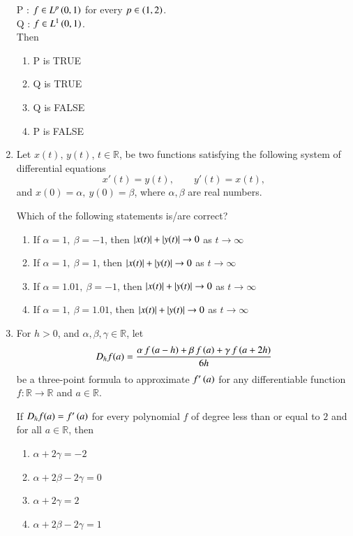 \documentclass[journal,12pt,onecolumn]{IEEEtran}
\theoremstyle{remark}
\begin{document}
\begin{enumerate}[start=1, label=Q.\arabic*]
P : $f\in L^{p}\left(0,1\right)$ for every $p\in \left(1,2\right)$.\\
Q : $f\in L^{1}\left(0,1\right)$.\\

Then
\begin{enumerate}
\item P is TRUE
\item Q is TRUE
\item Q is FALSE
\item P is FALSE
\end{enumerate}

\hfill{}


\item Let $x(t),\,y(t)$, $t\in \mathbb{R}$, be two functions satisfying the following system of differential equations\brak{:}
\[
x'(t)=y(t),\qquad y'(t)=x(t),
\]
and $x(0)=\alpha,\ y(0)=\beta$, where $\alpha,\beta$ are real numbers.  

Which of the following statements is/are correct?
\begin{enumerate}
\item If $\alpha=1,\ \beta=-1$, then $\left\vert x(t)\right\vert+\left\vert y(t)\right\vert\to 0$ as $t\to \infty$
\item If $\alpha=1,\ \beta=1$, then $\left\vert x(t)\right\vert+\left\vert y(t)\right\vert\to 0$ as $t\to \infty$
\item If $\alpha=1.01,\ \beta=-1$, then $\left\vert x(t)\right\vert+\left\vert y(t)\right\vert\to 0$ as $t\to \infty$
\item If $\alpha=1,\ \beta=1.01$, then $\left\vert x(t)\right\vert+\left\vert y(t)\right\vert\to 0$ as $t\to \infty$
\end{enumerate}

\hfill{}
\item For $h>0$, and $\alpha,\beta,\gamma\in \mathbb{R}$, let
\[
D_{h}f(a)=\frac{\alpha\, f\left(a-h\right)+\beta\, f\left(a\right)+\gamma\, f\left(a+2h\right)}{6h}
\]
be a three\mbox{-}point formula to approximate $f'\left(a\right)$ for any differentiable function $f\colon \mathbb{R}\to \mathbb{R}$ and $a\in \mathbb{R}$.  

If $D_{h}f(a)=f'\left(a\right)$ for every polynomial $f$ of degree less than or equal to $2$ and for all $a\in \mathbb{R}$, then
\begin{enumerate}
\item $\alpha+2\gamma=-2$
\item $\alpha+2\beta-2\gamma=0$
\item $\alpha+2\gamma=2$
\item $\alpha+2\beta-2\gamma=1$
\end{enumerate}


\end{enumerate}
\end{document}
